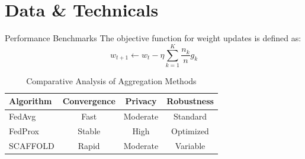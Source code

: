 
\section{Data \& Technicals}

\begin{frame}{Performance Benchmarks}
    The objective function for weight updates is defined as:
    \begin{equation}
        w_{t+1} \leftarrow w_t - \eta \sum_{k=1}^K \frac{n_k}{n} g_k
    \end{equation}

    \begin{table}
        \centering
        \caption{Comparative Analysis of Aggregation Methods}
        \begin{tabular}{lccc}
            \toprule
            \textbf{Algorithm} & \textbf{Convergence} & \textbf{Privacy} & \textbf{Robustness} \\
            \midrule
            FedAvg & Fast & Moderate & Standard \\
            FedProx & Stable & High & Optimized \\
            SCAFFOLD & Rapid & Moderate & Variable \\
            \bottomrule
        \end{tabular}
    \end{table}
\end{frame}
